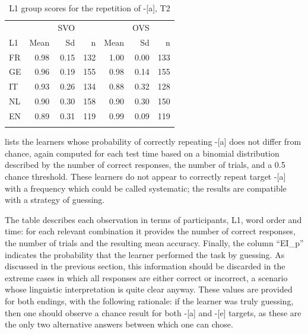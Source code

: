 \begin{table}[t]
    \begin{tabularx}{.66\textwidth}{Xrrr@{\hspace{1cm}}rrr}
    \lsptoprule
    &  & {SVO} && & {OVS} &\\
    L1 & Mean & Sd & n & Mean & Sd & n\\
    \midrule
    FR & 0.98 & 0.15 & 132 & 1.00 & 0.00 & 133\\
    GE & 0.96 & 0.19 & 155 & 0.98 & 0.14 & 155\\
    IT & 0.93 & 0.26 & 134 & 0.88 & 0.32 & 128\\
    NL & 0.90 & 0.30 & 158 & 0.90 & 0.30 & 150\\
    EN & 0.89 & 0.31 & 119 & 0.99 & 0.09 & 119\\
    \lspbottomrule
    \end{tabularx}
    \caption{L1 group scores for the repetition of -[a], T2}
    \label{tab:04:8}
\end{table}

 lists the learners whose probability of correctly repeating -[a] does not differ from chance, again computed for each test time based on a binomial distribution described by the number of correct responses, the number of trials, and a 0.5 chance threshold. These learners do not appear to correctly repeat target -[a] with a frequency which could be called systematic; the results are compatible with a strategy of guessing.

The table describes each observation in terms of participants, L1, word order and time: for each relevant combination it provides the number of correct responses, the number of trials and the resulting mean accuracy. Finally, the column “EI\_p” indicates the probability that the learner performed the task by guessing. As discussed in the previous section, this information should be discarded in the extreme cases in which all responses are either correct or incorrect, a scenario whose linguistic interpretation is quite clear anyway. These values are provided for both endings, with the following rationale: if the learner was truly guessing, then one should observe a chance result for both -[a] and -[e] targets, as these are the only two alternative answers between which one can chose.

